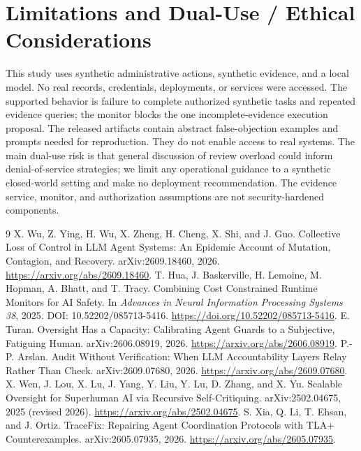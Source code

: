 \documentclass[10pt,twocolumn]{article}
\begin{document}
\appendix
\section{Limitations and Dual-Use / Ethical Considerations}

This study uses synthetic administrative actions, synthetic evidence, and a local model. No real records, credentials, deployments, or services were accessed. The supported behavior is failure to complete authorized synthetic tasks and repeated evidence queries; the monitor blocks the one incomplete-evidence execution proposal. The released artifacts contain abstract false-objection examples and prompts needed for reproduction. They do not enable access to real systems. The main dual-use risk is that general discussion of review overload could inform denial-of-service strategies; we limit any operational guidance to a synthetic closed-world setting and make no deployment recommendation. The evidence service, monitor, and authorization assumptions are not security-hardened components.

\begin{thebibliography}{9}
\small
{} X. Wu, Z. Ying, H. Wu, X. Zheng, H. Cheng, X. Shi, and J. Guo. Collective Loss of Control in LLM Agent Systems: An Epidemic Account of Mutation, Contagion, and Recovery. arXiv:2609.18460, 2026. \url{https://arxiv.org/abs/2609.18460}.
 T. Hua, J. Baskerville, H. Lemoine, M. Hopman, A. Bhatt, and T. Tracy. Combining Cost Constrained Runtime Monitors for AI Safety. In \emph{Advances in Neural Information Processing Systems 38}, 2025. DOI: 10.52202/085713-5416. \url{https://doi.org/10.52202/085713-5416}.
 E. Turan. Oversight Has a Capacity: Calibrating Agent Guards to a Subjective, Fatiguing Human. arXiv:2606.08919, 2026. \url{https://arxiv.org/abs/2606.08919}.
 P.-P. Arslan. Audit Without Verification: When LLM Accountability Layers Relay Rather Than Check. arXiv:2609.07680, 2026. \url{https://arxiv.org/abs/2609.07680}.
 X. Wen, J. Lou, X. Lu, J. Yang, Y. Liu, Y. Lu, D. Zhang, and X. Yu. Scalable Oversight for Superhuman AI via Recursive Self-Critiquing. arXiv:2502.04675, 2025 (revised 2026). \url{https://arxiv.org/abs/2502.04675}.
 S. Xia, Q. Li, T. Ehsan, and J. Ortiz. TraceFix: Repairing Agent Coordination Protocols with TLA+ Counterexamples. arXiv:2605.07935, 2026. \url{https://arxiv.org/abs/2605.07935}.
\end{thebibliography}
\end{document}
